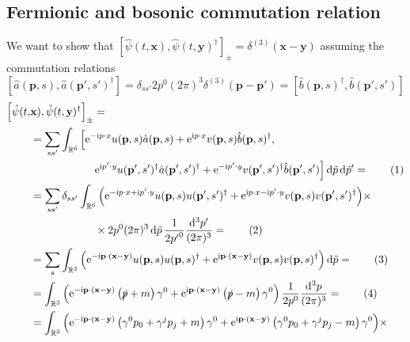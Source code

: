 \documentclass[english, parskip=full]{scrartcl}
\newcommand\numberthis{\addtocounter{equation}{1}\tag{\theequation}}
\newcommand{\intr}{}
\newcommand{\kla}{}
\newcommand{\klam}{}
\renewcommand{\i}{\text{i}}
\newcommand{\e}{\text{e}}
\begin{document}
\subsection{Fermionic and bosonic commutation relation}
We want to show that $\klam\left[ \hat{\psi}(t, \textbf{x}), \hat{\psi}(t, \textbf{y})^\dagger \right]_\pm = \delta^{(3)} (\textbf{x} - \textbf{y})$ assuming the commutation relations $\klam\left[ \hat{a}(\textbf{p}, s), \hat{a}(\textbf{p}', s')^\dagger \right] =  \delta_{ss'} 2p^0 (2\pi)^3 \delta^{(3)} (\textbf{p} - \textbf{p}') = \left[ \hat{b}(\textbf{p}, s)^\dagger, \hat{b}(\textbf{p}', s') \right]$
\begin{align*}
\Big[ \hat{\psi}(t, &\textbf{x}), \hat{\psi}(t, \textbf{y})^\dagger \Big]_\pm = \\
&= \sum_{ss'} \intr\int_{\mathbb{R}^{6}} \Big[ \e^{-\i p\cdot x} u(\textbf{p},s) \hat{a}(\textbf{p},s) + \e^{\i p\cdot x} v(\textbf{p},s) \hat{b}(\textbf{p},s)^\dagger, \\
& \hspace{2.1cm} \e^{\i p'\cdot y} u(\textbf{p}',s')^\dagger \hat{a}(\textbf{p}',s')^\dagger + \e^{-\i p'\cdot y} v(\textbf{p}',s')^\dagger \hat{b}(\textbf{p}',s') \Big] \, \mathrm{d}\tilde{p}\, \mathrm{d}\tilde{p}' = \numberthis \\
&= \sum_{ss'} \delta_{ss'} \intr\int_{\mathbb{R}^{6}} \Big( \e^{-\i p\cdot x + \i p'\cdot y} u(\textbf{p},s) u(\textbf{p}',s')^\dagger + \e^{\i p\cdot x - \i p'\cdot y} v(\textbf{p},s) v(\textbf{p}',s')^\dagger \Big) \times \\
&\hspace{2.1cm} \times 2p^0 (2\pi)^3 \, \mathrm{d}\tilde{p} \,\frac{1}{2{p'}^0} \frac{\mathrm{d}^3p'}{(2\pi)^3} = \numberthis \\
&= \sum_s \intr\int_{\mathbb{R}^{3}} \Big( \e^{-\i \textbf{p}\cdot (\textbf{x} - \textbf{y}) } u(\textbf{p},s) u(\textbf{p},s)^\dagger + \e^{\i \textbf{p}\cdot (\textbf{x} - \textbf{y}) } v(\textbf{p},s) v(\textbf{p},s)^\dagger \Big) \, \mathrm{d}\tilde{p} = \numberthis \\
&= \intr\int_{\mathbb{R}^{3}} \Big( \e^{-\i \textbf{p}\cdot (\textbf{x} - \textbf{y}) } \kla\left( \slashed{p} + m \right) \gamma^0 + \e^{\i \textbf{p}\cdot (\textbf{x} - \textbf{y}) } \left( \slashed{p} - m \right) \gamma^0 \Big)  \, \frac{1}{2p^0} \frac{ \mathrm{d}^{3}p}{(2\pi)^3} = \numberthis \\
&= \intr\int_{\mathbb{R}^{3}} \Big( \e^{-\i \textbf{p}\cdot (\textbf{x} - \textbf{y}) } \kla\left( \gamma^0 p_0 + \gamma^j p_j + m \right) \gamma^0 + \e^{\i \textbf{p}\cdot (\textbf{x} - \textbf{y}) } \left(  \gamma^0 p_0 + \gamma^j p_j - m \right) \gamma^0 \Big) \times\\

\end{align*}
\end{document}

